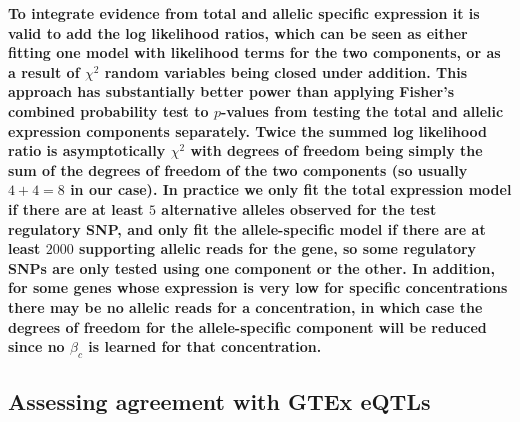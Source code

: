 \documentclass[9pt,lineno]{elife}
\newcommand{\tempbold}[1]{\textbf{#1}}
\begin{document}
\tempbold{To integrate evidence from total and allelic specific expression it is valid to add the log likelihood ratios, which can be seen as either fitting one model with likelihood terms for the two components, or as a result of $\chi^2$ random variables being closed under addition. This approach has substantially better power than applying Fisher's combined probability test to $p$-values from testing the total and allelic expression components separately. Twice the summed log likelihood ratio is asymptotically $\chi^2$  with degrees of freedom being simply the sum of the degrees of freedom of the two components (so usually $4+4=8$ in our case). In practice we only fit the total expression model if there are at least $5$ alternative alleles observed for the test regulatory SNP, and only fit the allele-specific model if there are at least $2000$ supporting allelic reads for the gene, so some regulatory SNPs are only tested using one component or the other. In addition, for some genes whose expression is very low for specific concentrations there may be no allelic reads for a concentration, in which case the degrees of freedom for the allele-specific component will be reduced since no $\beta_c$ is learned for that concentration.}

\subsection*{Assessing agreement with GTEx eQTLs}
\end{document}
